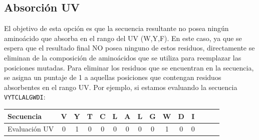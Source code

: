 \subsection{Absorción UV}

El objetivo de esta opción es que la secuencia resultante no posea ningún aminoácido que absorba en el rango del UV (W,Y,F).
En este caso, ya que se espera que el resultado final NO posea ninguno de estos residuos, directamente se eliminan de la composición de aminoácidos que se utiliza para reemplazar las posiciones mutadas. 
Para eliminar los residuos que se encuentran en la secuencia, se asigna un puntaje de 1 a aquellas posiciones que contengan residuos absorbentes en el rango UV. 
Por ejemplo, si estamos evaluando la secuencia \texttt{VYTCLALGWDI}:

  \vspace{0.5cm}

\begin{center}
\begin{tabular}{lcccccccccccccc} 
\hline
Secuencia 	& \textbf{V} & \textbf{Y} & \textbf{T} & \textbf{C} & \textbf{L} & \textbf{A} & \textbf{L} & \textbf{G} & \textbf{W} & \textbf{D} & \textbf{I}\\ \hline
Evaluación UV 	& 0 & 1 & 0 & 0 & 0 & 0 & 0 & 0 & 1 & 0 & 0  \\ \hline
\end{tabular}
\end{center}